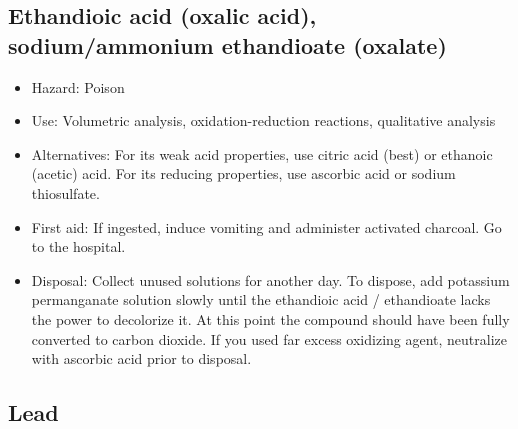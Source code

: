 \subsection{Ethandioic acid (oxalic acid), 
sodium/ammonium ethandioate (oxalate)}

\begin{itemize}

\item{Hazard: Poison}

\item{Use: Volumetric analysis, 
oxidation-reduction reactions, qualitative analysis}

\item{Alternatives: For its weak acid properties, 
use citric acid (best) or ethanoic (acetic) acid. 
For its reducing properties, use ascorbic acid or sodium thiosulfate.}

\item{First aid: If ingested, induce vomiting 
and administer activated charcoal. Go to the hospital.}

\item{Disposal: Collect unused solutions for another day. 
To dispose, add potassium permanganate solution slowly 
until the ethandioic acid / ethandioate lacks the power to decolorize it. 
At this point the compound should have been fully converted to carbon dioxide. 
If you used far excess oxidizing agent, 
neutralize with ascorbic acid prior to disposal.}

\end{itemize}

\subsection{Lead}

